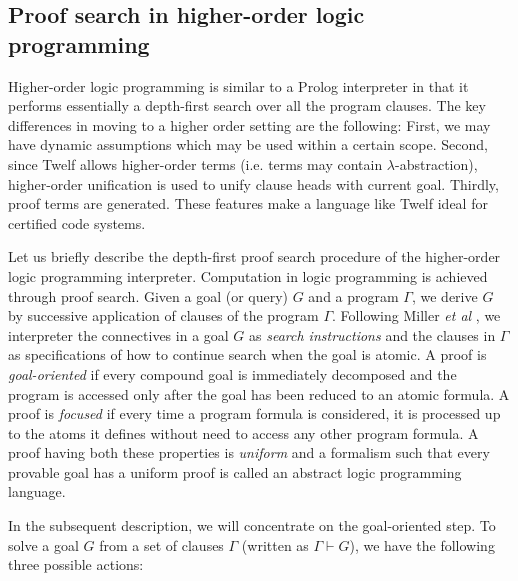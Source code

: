\documentclass{acmconf}
\newcommand{\vd}{\vdash}
\begin{document}
\subsection{Proof search in higher-order logic programming}

Higher-order logic programming is similar to a Prolog interpreter in
that it performs essentially a depth-first search over all the program
clauses. The key differences in moving to a higher order setting are
the following: First, we may have dynamic assumptions which may be
used within a certain scope. Second, since Twelf allows higher-order
terms (i.e. terms may contain $\lambda$-abstraction), higher-order
unification is used to unify clause heads with current goal. Thirdly,
proof terms are generated. These features make a language like Twelf
ideal for certified code systems.

Let us briefly describe the depth-first proof search procedure of
the higher-order logic programming interpreter. Computation in logic
programming is achieved through proof search. Given a goal (or query)
$G$ and a program $\Gamma$, we derive $G$ by successive application of
clauses of the program $\Gamma$. Following Miller {\em{et al}}
\cite{Miller91apal}, we interpreter the connectives in a goal $G$ as
{\em{search instructions}} and the clauses in $\Gamma$ as
specifications of how to continue search when the goal is atomic. A
proof is {\em{goal-oriented}} if every compound goal is immediately
decomposed and the program is accessed only after the goal has been
reduced to an atomic formula. A proof is {\em{focused}} if every time
a program formula is considered, it is processed up to the atoms it
defines without need to access any other program formula. A proof
having both these properties is {\em{uniform}} and a formalism such
that every provable goal has a uniform proof is called an abstract
logic programming language.

In the subsequent description, we will concentrate on the
goal-oriented step. To solve a goal $G$ from a set of clauses $\Gamma$
(written as $\Gamma \vd G$), we have the following three possible
actions:   
\end{document}
